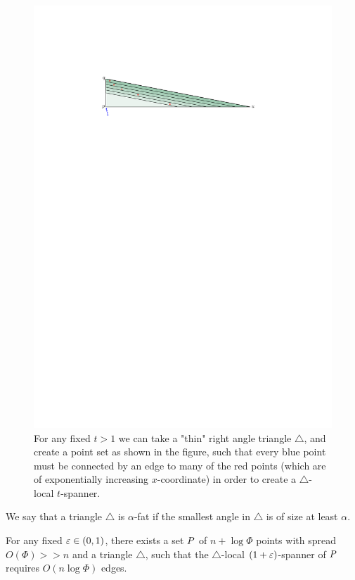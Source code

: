 \documentclass[12pt]{article}%
\begin{document}
\begin{figure}[h]
	\centering
	\includegraphics{figs/triangle_lower_bound}
	\caption{For any fixed $t>1$ we can take a "thin" right angle triangle $\triangle$, and create a point set as shown in the figure, such that every blue point must be connected by an edge to many of the red points (which are of exponentially increasing $x$-coordinate) in order to create a $\triangle$-local $t$-spanner.}
\end{figure}


\begin{defn}
	We say that a triangle $\triangle$ is $\alpha$-fat if the smallest angle in $\triangle$ is of size at least $\alpha$.
\end{defn}

\begin{claim}
	For any fixed $\varepsilon \in (0,1)$, there exists a set $P$ of $n+\log\Phi$ points with spread $O(\Phi)>> n$ and a triangle $\triangle$, such that the $\triangle$-local $(1+\varepsilon)$-spanner of $P$ requires $O\left(n\log\Phi\right)$ edges. 
\end{claim}
\end{document}
